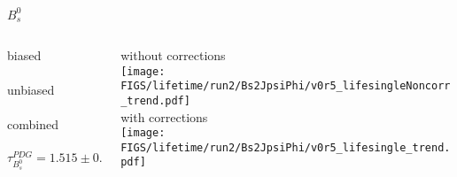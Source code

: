 \begin{frame}{$B_s^0$}
  
  \begin{columns}
  
  \begin{column}{0.45\textwidth}
  {\color{scqorange}biased} \\[2mm]
  \resizebox{\textwidth}{!}{}\\[5mm]
  {\color{scqred}unbiased} \\[2mm]
  \resizebox{\textwidth}{!}{}\\[5mm]
  {\color{scqgreen}combined} \\[2mm]
  \resizebox{\textwidth}{!}{}\\
  \begin{equation*}
    \tau_{B_s^0}^{PDG} = 1.515 \pm 0.004
  \end{equation*}
  \end{column}
  
  \begin{column}{0.45\textwidth}
  \footnotesize
  {without corrections}\\[2mm]
  \texttt{[image: \\FIGS/lifetime/run2/Bs2JpsiPhi/v0r5\_lifesingleNoncorr\_trend.pdf]}\\[3mm]
  {with corrections}\\[2mm]
  \texttt{[image: \\FIGS/lifetime/run2/Bs2JpsiPhi/v0r5\_lifesingle\_trend.pdf]}
  \end{column}
  
  \end{columns}

\end{frame}



